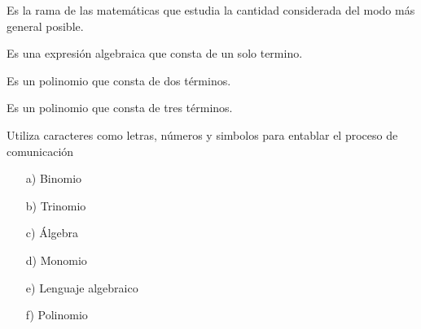 
\begin{multicols}{2}
  \question Es la rama de las matemáticas que estudia la cantidad
            considerada del modo más general posible.

  \question Es una expresión algebraica que consta de un solo termino.

  \question Es un polinomio que consta de dos términos.

  \question Es un polinomio que consta de tres términos.

  \question Utiliza caracteres como letras, números y simbolos para entablar
            el proceso de comunicación
\columnbreak

  \begin{enumerate}
    \item[a)] Binomio
    \vspace{\baselineskip}
    \item[b)] Trinomio
    \vspace{\baselineskip}
    \item[c)] Álgebra
    \vspace{\baselineskip}
    \item[d)] Monomio
    \vspace{\baselineskip}
    \item[e)] Lenguaje algebraico
    \vspace{\baselineskip}
    \item[f)] Polinomio
  \end{enumerate}
\end{multicols}
